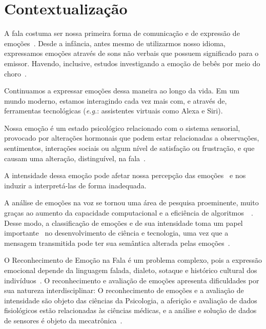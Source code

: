 
\section{Contextualização}

A fala costuma ser nossa primeira forma de comunicação e de expressão de emoções~\cite{1.5}. Desde a infância, antes mesmo de utilizarmos nosso idioma, expressamos emoções através de sons não verbais que possuem significado para o emissor. Havendo, inclusive, estudos investigando a emoção de bebês por meio do choro~\cite{0}.

Continuamos a expressar emoções dessa maneira ao longo da vida. Em um mundo moderno, estamos interagindo cada vez mais com, e através de, ferramentas tecnológicas (\textit{e.g.}: assistentes virtuais como Alexa e Siri).

Nossa emoção é um estado psicológico relacionado com o sistema sensorial, provocado por alterações hormonais que podem estar relacionadas a observações, sentimentos, interações sociais ou algum nível de satisfação ou frustração, e que causam uma alteração, distinguível, na fala~\cite{8}.

A intensidade dessa emoção pode afetar nossa percepção das emoções~\cite{18.46} e nos induzir a interpretá-las de forma inadequada.

A análise de emoções na voz se tornou uma área de pesquisa proeminente, muito graças ao aumento da capacidade computacional e a eficiência de algoritmos~\cite{38}~\cite{20}. Desse modo, a classificação de emoções e de sua intensidade toma um papel importante~\cite{3} no desenvolvimento de ciência e tecnologia, uma vez que a mensagem transmitida pode ter sua semântica alterada pelas emoções~\cite{39}.

O Reconhecimento de Emoção na Fala é um problema complexo, pois a expressão emocional depende da linguagem falada, dialeto, sotaque e histórico cultural dos indivíduos~\cite{6}. O reconhecimento e avaliação de emoções apresenta dificuldades por sua natureza interdisciplinar: O reconhecimento de emoções e a avaliação de intensidade são objeto das ciências da Psicologia, a aferição e avaliação de dados fisiológicos estão relacionadas às ciências médicas, e a análise e solução de dados de sensores é objeto da mecatrônica~\cite{17}.

